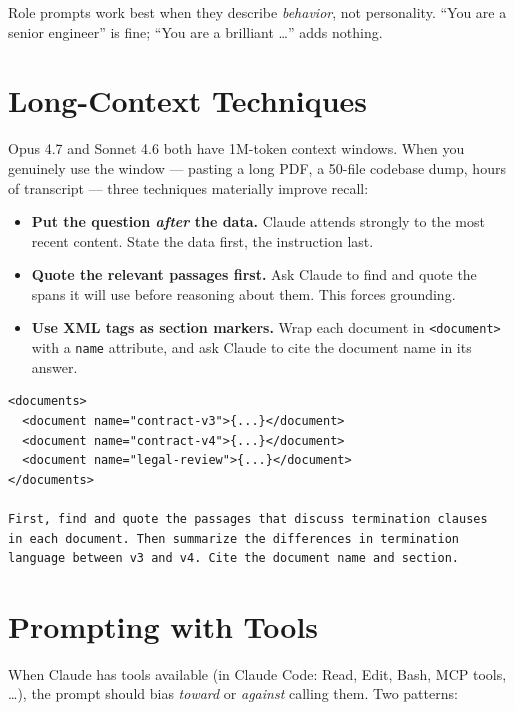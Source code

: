Role prompts work best when they describe \emph{behavior}, not personality.
``You are a senior engineer'' is fine; ``You are a brilliant
\dots'' adds nothing.

\section{Long-Context Techniques}
\label{sec:long-context}


Opus 4.7 and Sonnet 4.6 both have 1M-token context windows. When you
genuinely use the window — pasting a long PDF, a 50-file codebase dump,
hours of transcript — three techniques materially improve recall:

\begin{itemize}
  \item \textbf{Put the question \emph{after} the data.} Claude attends
        strongly to the most recent content. State the data first, the
        instruction last.
  \item \textbf{Quote the relevant passages first.} Ask Claude to find
        and quote the spans it will use before reasoning about them.
        This forces grounding.
  \item \textbf{Use XML tags as section markers.} Wrap each document in
        \texttt{<document>} with a \texttt{name} attribute, and ask
        Claude to cite the document name in its answer.
\end{itemize}

\begin{lstlisting}[caption={Long-context skeleton}]
<documents>
  <document name="contract-v3">{...}</document>
  <document name="contract-v4">{...}</document>
  <document name="legal-review">{...}</document>
</documents>

First, find and quote the passages that discuss termination clauses
in each document. Then summarize the differences in termination
language between v3 and v4. Cite the document name and section.
\end{lstlisting}

\section{Prompting with Tools}
\label{sec:tool-use-prompting}


When Claude has tools available (in Claude Code: Read, Edit, Bash, MCP
tools, \dots), the prompt should bias \emph{toward} or \emph{against}
calling them. Two patterns:

